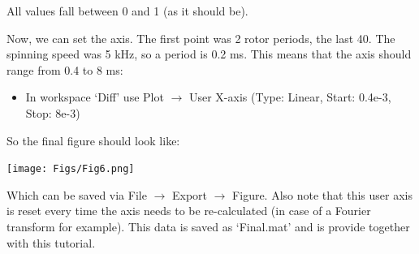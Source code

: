 \documentclass[11pt,a4paper]{article}
\begin{document}
All values fall between 0 and 1 (as it should be).

Now, we can set the axis.
The first point was 2 rotor periods, the last 40. 
The spinning speed was 5 kHz, so a period is 0.2 ms.
This means that the axis should range from 0.4 to 8 ms:
\begin{itemize}
\item In workspace `Diff' use Plot $\longrightarrow$ User X-axis (Type: Linear, Start: 0.4e-3, Stop: 8e-3)
\end{itemize}
So the final figure should look like:
\begin{center}
\texttt{[image: Figs/Fig6.png]}
\end{center}
Which can be saved via File $\longrightarrow$ Export $\longrightarrow$ Figure.
Also note that this user axis is reset every time the axis needs to be re-calculated (in case of a Fourier transform for example).
This data is saved as `Final.mat' and is provide together with this tutorial.
\end{document}
